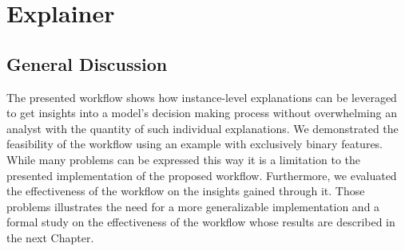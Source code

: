 \chapter{Explainer}
\label{chap:explainer}


\section{General Discussion}
The presented workflow \cite{explainer} shows how instance-level explanations can be leveraged to get insights into a model's decision making process without overwhelming an analyst with the quantity of such individual explanations.
We demonstrated the feasibility of the workflow using an example with exclusively binary features.
While many problems can be expressed this way it is a limitation to the presented implementation of the proposed workflow.
Furthermore, we evaluated the effectiveness of the workflow on the insights gained through it.
Those problems illustrates the need for a more generalizable implementation and a formal study on the effectiveness of the workflow whose results are described in the next Chapter.


